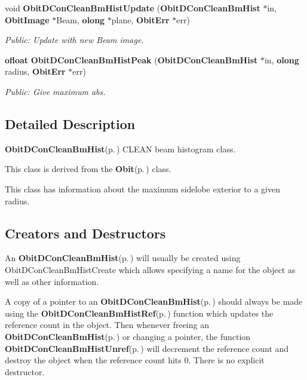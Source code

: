 \begin{CompactItemize}
void {\bf Obit\-DCon\-Clean\-Bm\-Hist\-Update} ({\bf Obit\-DCon\-Clean\-Bm\-Hist} $\ast$in, {\bf Obit\-Image} $\ast$Beam, {\bf olong} $\ast$plane, {\bf Obit\-Err} $\ast$err)
\begin{CompactList}\small\item\em Public: Update with new Beam image. \item\end{CompactList}\item 
{\bf ofloat} {\bf Obit\-DCon\-Clean\-Bm\-Hist\-Peak} ({\bf Obit\-DCon\-Clean\-Bm\-Hist} $\ast$in, {\bf olong} radius, {\bf Obit\-Err} $\ast$err)
\begin{CompactList}\small\item\em Public: Give maximum abs. \item\end{CompactList}\end{CompactItemize}


\subsection{Detailed Description}
{\bf Obit\-DCon\-Clean\-Bm\-Hist}{\rm (p.\,\pageref{structObitDConCleanBmHist})} CLEAN beam histogram class. 

This class is derived from the {\bf Obit}{\rm (p.\,\pageref{structObit})} class.

This class has information about the maximum sidelobe exterior to a given radius.\subsection{Creators and Destructors}\label{ObitDConCleanBmHist_8h_ObitDConCleanBmHistaccess}
An {\bf Obit\-DCon\-Clean\-Bm\-Hist}{\rm (p.\,\pageref{structObitDConCleanBmHist})} will usually be created using Obit\-DCon\-Clean\-Bm\-Hist\-Create which allows specifying a name for the object as well as other information.

A copy of a pointer to an {\bf Obit\-DCon\-Clean\-Bm\-Hist}{\rm (p.\,\pageref{structObitDConCleanBmHist})} should always be made using the {\bf Obit\-DCon\-Clean\-Bm\-Hist\-Ref}{\rm (p.\,\pageref{ObitDConCleanBmHist_8h_a1})} function which updates the reference count in the object. Then whenever freeing an {\bf Obit\-DCon\-Clean\-Bm\-Hist}{\rm (p.\,\pageref{structObitDConCleanBmHist})} or changing a pointer, the function {\bf Obit\-DCon\-Clean\-Bm\-Hist\-Unref}{\rm (p.\,\pageref{ObitDConCleanBmHist_8h_a0})} will decrement the reference count and destroy the object when the reference count hits 0. There is no explicit destructor.

